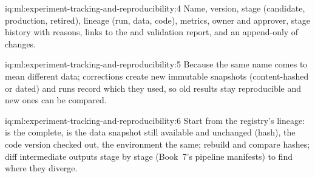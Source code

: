 \begin{solution}{iq:ml:experiment-tracking-and-reproducibility:4}
Name, version, stage (candidate, production, retired), lineage (run, data, code), metrics, owner and approver, stage history with
reasons, links to the  and validation report, and an append-only  of changes.
\end{solution}

\begin{solution}{iq:ml:experiment-tracking-and-reproducibility:5}
Because the same name comes to mean different data; corrections create new immutable snapshots (content-hashed or dated) and runs
record which they used, so old results stay reproducible and new ones can be compared.
\end{solution}

\begin{solution}{iq:ml:experiment-tracking-and-reproducibility:6}
Start from the registry's lineage: is the  complete, is the data snapshot still available and unchanged (hash), the
code version checked out, the environment the same; rebuild and compare hashes; diff intermediate outputs stage by stage (Book~7's
pipeline manifests) to find where they diverge.
\end{solution}
